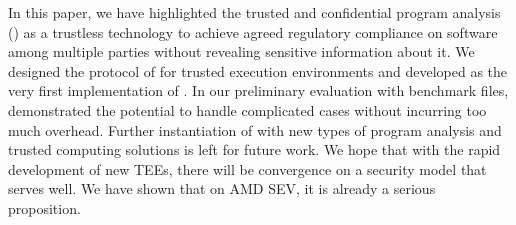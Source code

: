 In this paper, we have highlighted the trusted and confidential program 
analysis (\tcpa) as a trustless technology to achieve agreed regulatory compliance 
on software among multiple parties without revealing sensitive information 
about it. We designed the protocol of \tcpa for trusted execution 
environments and developed \tool as the very first implementation of \tcpa. 
In our preliminary evaluation with \wasm benchmark files, \tool demonstrated the 
potential to handle complicated cases without incurring too much overhead. 
Further instantiation of \tcpa with new types of program analysis and trusted computing 
solutions is left for future work. We hope that with the rapid development of new TEEs, there will be convergence on a 
security model that serves \tcpa well. We have shown that on AMD SEV, it is already a serious proposition.